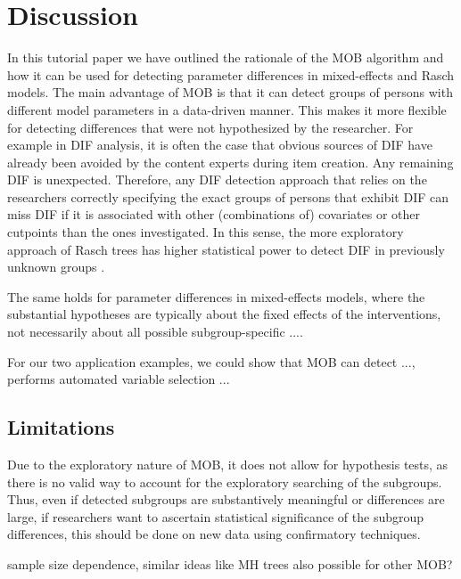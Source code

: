 \documentclass[doc,floatsintext,natbib]{apa7}
\begin{document}
\FloatBarrier
\section{Discussion}

In this tutorial paper we have outlined the rationale of the MOB algorithm and how it can be used for detecting parameter differences in mixed-effects and Rasch models. The main advantage of MOB is that it can detect groups of persons with different model parameters in a data-driven manner. This makes it more flexible for detecting differences that were not hypothesized by the researcher. For example in DIF analysis, it is often the case that obvious sources of DIF have already been avoided by the content experts during item creation. Any remaining DIF is unexpected. Therefore, any DIF detection approach that relies on the researchers correctly specifying the exact groups of persons that exhibit DIF can miss DIF if it is associated with other (combinations of) covariates or other cutpoints than the ones investigated. In this sense, the more exploratory approach of Rasch trees has higher statistical power to detect DIF in previously unknown groups \citep{StrKopZei:2015:P}. 

The same holds for parameter differences in mixed-effects models, where the substantial hypotheses are typically about the fixed effects of the interventions, not necessarily about all possible subgroup-specific .... 


For our two application examples, we could show that MOB can detect ..., performs automated variable selection ...



\subsection{Limitations}

Due to the exploratory nature of MOB, it does not allow for hypothesis tests, as there is no valid way to account for the exploratory searching of the subgroups. Thus, even if detected subgroups are substantively meaningful or differences are large, if researchers want to ascertain statistical significance of the subgroup differences, this should be done on new data using confirmatory techniques.




sample size dependence, similar ideas like MH trees also possible for other MOB? 
\end{document}
